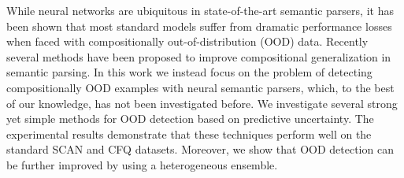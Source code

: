 While neural networks are ubiquitous in state-of-the-art semantic parsers, it has been shown that  most standard models suffer from dramatic performance losses when faced with compositionally out-of-distribution (OOD) data. Recently several methods have been proposed to improve compositional generalization in semantic parsing. In this work we instead focus on the problem of detecting compositionally OOD examples with neural semantic parsers, which, to the best of our knowledge, has not been investigated before. We investigate several strong yet simple methods for OOD detection based on predictive uncertainty. The experimental results demonstrate that these techniques perform well on the standard SCAN and CFQ datasets. Moreover, we show that OOD detection can be further improved by using a heterogeneous ensemble.

